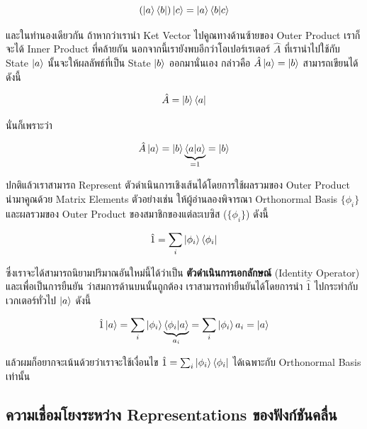 \begin{equation}
  (\ket{a}\bra{b}) \ket{c}
  =
  \ket{a} \braket{b}{c}
\end{equation}

\noindent และในทำนองเดียวกัน ถ้าหากว่าเรานำ Ket Vector ไปคูณทางด้านซ้ายของ Outer Product เราก็จะได้ Inner Product ที่คล้ายกัน
นอกจากนี้เรายังพบอีกว่าโอเปอร์เรเตอร์ $\hat{A}$ ที่เรานำไปใช้กับ State $\ket{a}$ นั้นจะให้ผลลัพธ์ที่เป็น State $\ket{b}$ ออกมานั่นเอง
กล่าวคือ $\hat{A}\ket{a} = \ket{b}$ สามารถเขียนได้ดังนี้

\begin{equation}
  \hat{A} = \ket{b}\bra{a}
\end{equation}

\noindent นั่นก็เพราะว่า

\begin{equation}
  \hat{A} \ket{a}
  =
  \ket{b} \underbrace{\braket{a}{a}}_{=1}
  =
  \ket{b}
\end{equation}

ปกติแล้วเราสามารถ Represent ตัวดำเนินการเชิงเส้นได้โดยการใช้ผลรวมของ Outer Product นำมาคูณด้วย Matrix Elements ตัวอย่างเช่น
ให้ผู้อ่านลองพิจารณา Orthonormal Basis $\{ \phi_i \}$ และผลรวมของ Outer Product ของสมาชิกของแต่ละเบซิส ($\{ \phi_i \}$)
ดังนี้

\begin{equation}
  \hat{1}
  =
  \sum_i \ket{\phi_i}\bra{\phi_i}
\end{equation}

\noindent ซึ่งเราจะได้สามารถนิยามปริมาณอันใหม่นี้ได้ว่าเป็น \textbf{ตัวดำเนินการเอกลักษณ์} (Identity Operator) และเพื่อเป็นการยืนยัน%
ว่าสมการด้านบนนั้นถูกต้อง เราสามารถทำยืนยันได้โดยการนำ $\hat{1}$ ไปกระทำกับเวกเตอร์ทั่วไป $\ket{a}$ ดังนี้

\begin{equation}
  \hat{1}\ket{a}
  =
  \sum_i \ket{\phi_i}\underbrace{\braket{\phi_i}{a}}_{a_i}
  =
  \sum_i \ket{\phi_i} a_i
  =
  \ket{a}
\end{equation}

\noindent แล้วผมก็อยากจะเน้นด้วยว่าเราจะใช้เงื่อนไข $\hat{1} = \sum_i \ket{\phi_i}\bra{\phi_i}$ ได้เฉพาะกับ Orthonormal
Basis เท่านั้น

\subsection{ความเชื่อมโยงระหว่าง Representations ของฟังก์ชันคลื่น}


